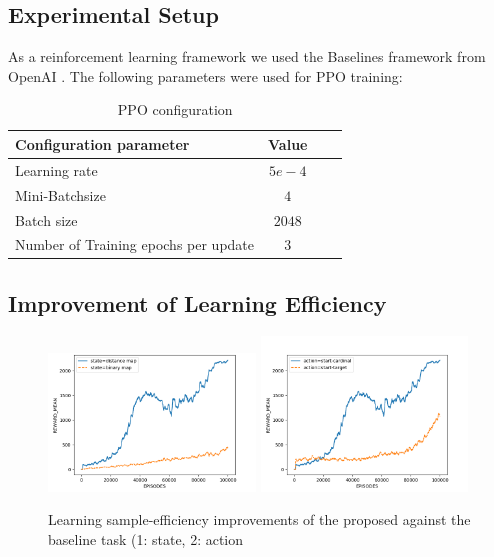 \documentclass{article}
\begin{document}
\subsection{Experimental Setup}
As a reinforcement learning framework we used the Baselines framework from OpenAI \citep{baselines}. 
The following parameters were used for PPO training:
\begin{table}[!htbp]
\centering
\label{tab:tuning_param}
\begin{tabular}{|l|c|c|c|}

\hline 
\textbf{Configuration parameter} & \textbf{Value}  \\ \hline
Learning rate	 		& $5e-4$	  \\ \hline
Mini-Batchsize	 		& $4$	 	   \\ \hline
Batch size	 & $2048$	    \\ \hline
Number of Training epochs per update	 & $3$	    \\ \hline
\end{tabular}
\caption{PPO configuration}
\end{table}

\subsection{Improvement of Learning Efficiency}

\begin{figure}
\centering
\includegraphics[width=5.5cm]{figures/efficiency-state.png}
\includegraphics[width=5.5cm]{figures/efficiency-actions.png}
\caption{Learning sample-efficiency improvements of the proposed against the baseline task (1: state, 2: action}
\label{fig:efficiency}
\end{figure}
\end{document}
